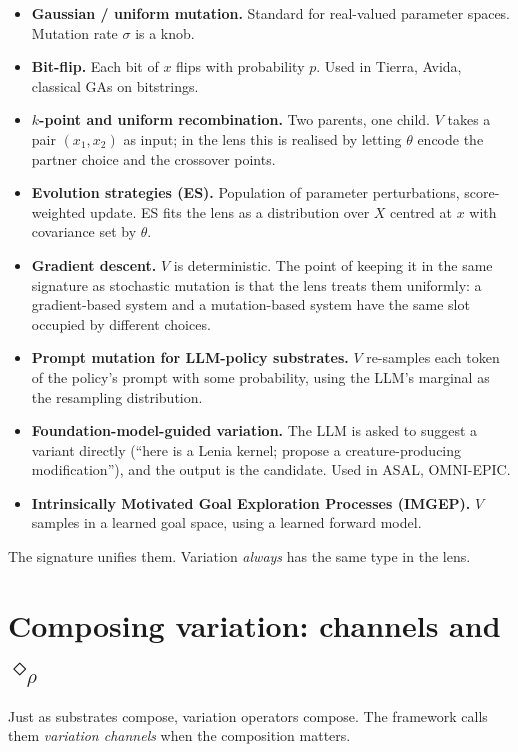 \begin{itemize}[leftmargin=1.5em,itemsep=2pt]
  \item \textbf{Gaussian / uniform mutation.} Standard for real-valued
    parameter spaces. Mutation rate $\sigma$ is a knob.
  \item \textbf{Bit-flip.} Each bit of $x$ flips with probability $p$.
    Used in Tierra, Avida, classical GAs on bitstrings.
  \item \textbf{$k$-point and uniform recombination.} Two parents, one
    child. $V$ takes a pair $(x_1, x_2)$ as input; in the lens this is
    realised by letting $\theta$ encode the partner choice and the
    crossover points.
  \item \textbf{Evolution strategies (ES).} Population of parameter
    perturbations, score-weighted update. ES fits the lens as a
    distribution over $X$ centred at $x$ with covariance set by
    $\theta$.
  \item \textbf{Gradient descent.} $V$ is deterministic. The point of
    keeping it in the same signature as stochastic mutation is that
    the lens treats them uniformly: a gradient-based system and a
    mutation-based system have the same slot occupied by different
    choices.
  \item \textbf{Prompt mutation for LLM-policy substrates.} $V$
    re-samples each token of the policy's prompt with some
    probability, using the LLM's marginal as the resampling
    distribution.
  \item \textbf{Foundation-model-guided variation.} The LLM is asked
    to suggest a variant directly (``here is a Lenia kernel; propose
    a creature-producing modification''), and the output is the
    candidate. Used in ASAL, OMNI-EPIC.
  \item \textbf{Intrinsically Motivated Goal Exploration Processes
    (IMGEP).} $V$ samples in a learned goal space, using a learned
    forward model.
\end{itemize}

The signature unifies them. Variation \emph{always} has the same type
in the lens.

\section{Composing variation: channels and $\diamond_\rho$}

Just as substrates compose, variation operators compose. The framework
calls them \emph{variation channels} when the composition matters.

